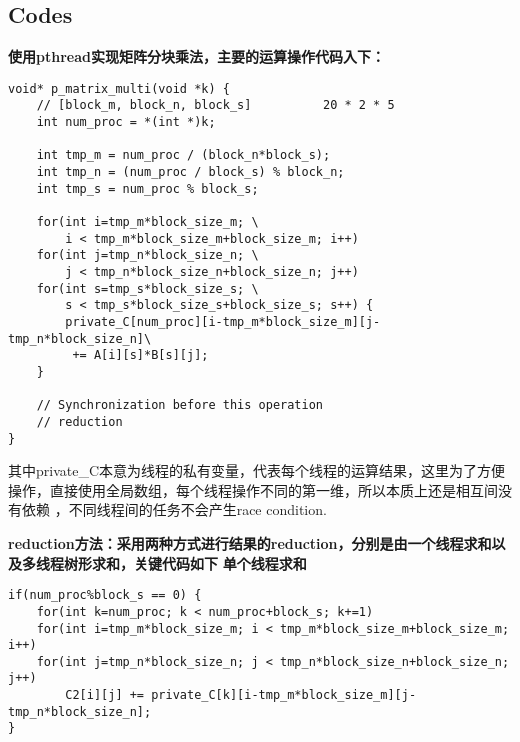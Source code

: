 \documentclass{article}
\begin{document}
\subsection{Codes}
\textbf{使用pthread实现矩阵分块乘法，主要的运算操作代码入下：}
\begin{lstlisting}
void* p_matrix_multi(void *k) {
    // [block_m, block_n, block_s]          20 * 2 * 5
    int num_proc = *(int *)k;

    int tmp_m = num_proc / (block_n*block_s);
    int tmp_n = (num_proc / block_s) % block_n;
    int tmp_s = num_proc % block_s;

    for(int i=tmp_m*block_size_m; \
        i < tmp_m*block_size_m+block_size_m; i++)
    for(int j=tmp_n*block_size_n; \
        j < tmp_n*block_size_n+block_size_n; j++)
    for(int s=tmp_s*block_size_s; \ 
        s < tmp_s*block_size_s+block_size_s; s++) {
        private_C[num_proc][i-tmp_m*block_size_m][j-tmp_n*block_size_n]\
         += A[i][s]*B[s][j];
    }

    // Synchronization before this operation
    // reduction
}
\end{lstlisting}
其中private\_C本意为线程的私有变量，代表每个线程的运算结果，这里为了方便操作，直接使用全局数组，每个线程操作不同的第一维，所以本质上还是相互间没有依赖
，不同线程间的任务不会产生race condition.

\textbf{
reduction方法：采用两种方式进行结果的reduction，分别是由一个线程求和以及多线程树形求和，关键代码如下
}
\newline
\textbf{单个线程求和}
\begin{lstlisting}
if(num_proc%block_s == 0) {
    for(int k=num_proc; k < num_proc+block_s; k+=1)
    for(int i=tmp_m*block_size_m; i < tmp_m*block_size_m+block_size_m; i++)
    for(int j=tmp_n*block_size_n; j < tmp_n*block_size_n+block_size_n; j++)
        C2[i][j] += private_C[k][i-tmp_m*block_size_m][j-tmp_n*block_size_n];
}
\end{lstlisting}
\end{document}
